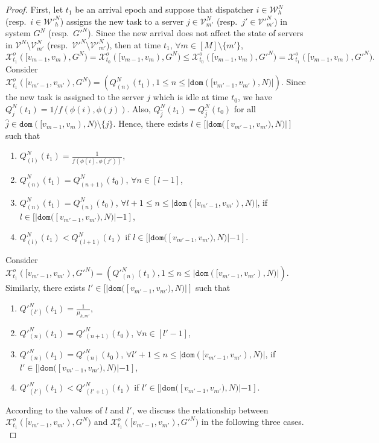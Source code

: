 \documentclass[11pt, reqno]{article}
\numberwithin{equation}{section}
\numberwithin{theorem}{section}
\newcommand{\dom}{\texttt{dom}}
\begin{document}
\begin{proof}
First, let $t_1$ be an arrival epoch and suppose that dispatcher $i\in\mathcal{W}^N_h$ (resp.~$i\in \mathcal{W}'^N_h$) assigns the new task to a server $j\in\mathcal{V}^N_{m'}$ (resp.~$j'\in\mathcal{V}'^N_{m'}$) in system $G^N$ (resp.~$G'^N$). Since the new arrival does not affect the state of servers in $\mathcal{V}^N\setminus\mathcal{V}^N_{m'}$ (resp.~$\mathcal{V}'^N\setminus\mathcal{V}'^N_{m'}$), then at time $t_1$, $\forall m\in[M]\setminus \{m'\}$, $$\mathcal{X}^o_{t_1}([v_{m-1},v_m),G^N)=\mathcal{X}^o_{t_0}([v_{m-1},v_m),G^N)\leq \mathcal{X}^o_{t_0}([v_{m-1},v_m),G'^N)=\mathcal{X}^o_{t_1}([v_{m-1},v_m),G'^N).$$
    Consider $\mathcal{X}^o_{t_1}([v_{m'-1},v_{m'}),G^N)=(Q^N_{(n)}(t_1),1\leq n\leq |\dom([v_{m'-1},v_{m'}),N)|)$. Since the new task is assigned to the server $j$ which is idle at time $t_0$, we have $Q^N_j(t_1)=1/f(\phi(i),\phi(j))$. Also, $Q^N_{\hat{j}}(t_1)=Q^N_{\hat{j}}(t_0)$ for all ${\hat{j}}\in\dom([v_{m-1},v_m),N)\setminus\{j\}$. Hence, there exists $l\in[|\dom([v_{m'-1},v_{m'}),N)|]$ such that
    \begin{enumerate}[\normalfont(i)]
        \item $Q^N_{(l)}(t_1)=\frac{1}{f(\phi(i),\phi(j'))}$,
        \item $Q^N_{(n)}(t_1)=Q^N_{(n+1)}(t_0)$, $\forall n\in[l-1]$,
        \item $Q^N_{(n)}(t_1)=Q^N_{(n)}(t_0)$, $\forall l+1\leq n\leq |\dom([v_{m'-1},v_{m'}),N)|$, if $l\in[|\dom([v_{m'-1},v_{m'}),N)|-1]$,
        \item $Q^N_{(l)}(t_1)<Q^N_{(l+1)}(t_1)$ if $l\in[|\dom([v_{m'-1},v_{m'}),N)|-1]$.
    \end{enumerate}
    Consider $\mathcal{X}^o_{t_1}([v_{m'-1},v_{m'}),G'^N)=(Q'^N_{(n)}(t_1),1\leq n\leq |\dom([v_{m'-1},v_{m'}),N)|)$. Similarly, there exists $l'\in[|\dom([v_{m'-1},v_{m'}),N)|]$ such that 
    \begin{enumerate}[\normalfont(i)]
        \item $Q'^N_{(l')}(t_1)=\frac{1}{\mu_{h,m'}}$,
        \item $Q'^N_{(n)}(t_1)=Q'^N_{(n+1)}(t_0)$, $\forall n\in[l'-1]$,
        \item $Q'^N_{(n)}(t_1)=Q'^N_{(n)}(t_0)$, $\forall l'+1\leq n\leq |\dom([v_{m'-1},v_{m'}),N)|$, if $l'\in[|\dom([v_{m'-1},v_{m'}),N)|-1]$,
        \item $Q'^N_{(l')}(t_1)<Q'^N_{(l'+1)}(t_1)$ if $l'\in[|\dom([v_{m'-1},v_{m'}),N)|-1]$.
    \end{enumerate}
    According to the values of $l$ and $l'$, we discuss the relationship between $ \mathcal{X}^o_{t_1}([v_{m'-1},v_{m'}),G^N)$ and $ \mathcal{X}^o_{t_1}([v_{m'-1},v_{m'}),G'^N)$ in the following three cases.\\
    

\end{proof}
\end{document}
